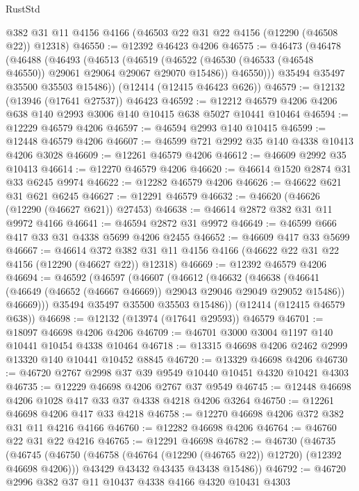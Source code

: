 \begin{lexlean}{RustStd}
\begin{coremodule}
{\begin{coremodule}
{{{{{{{{{{{{{{{{{{{{{{{{{{{{{{{{{{{{{{{{{{{{{{{{{{    @382
    @31
    @11
    @4156
    @4166
    (@46503 @22 @31 @22 @4156 (@12290 (@46508 @22)) @12318)
@46550 := @12392 @46423 @4206
@46575 := @46473
    (@46478
      (@46488
        (@46493
          (@46513
            (@46519
              (@46522 (@46530 (@46533 (@46548 @46550)) @29061 @29064 @29067 @29070 @15486))
              @46550)))
        @35494
        @35497
        @35500
        @35503
        @15486))
    (@12414 (@12415 @46423 @626))
@46579 := @12132 (@13946 (@17641 @27537)) @46423
@46592 := @12212 @46579 @4206 @4206 @638 @140 @2993 @3006 @140 @10415 @638 @5027 @10441 @10464
@46594 := @12229 @46579 @4206
@46597 := @46594 @2993 @140 @10415
@46599 := @12448 @46579 @4206
@46607 := @46599 @721 @2992 @35 @140 @4338 @10413 @4206 @3028
@46609 := @12261 @46579 @4206
@46612 := @46609 @2992 @35 @10413
@46614 := @12270 @46579 @4206
@46620 := @46614 @1520 @2874 @31 @33 @6245 @9974
@46622 := @12282 @46579 @4206
@46626 := @46622 @621 @31 @621 @6245
@46627 := @12291 @46579
@46632 := @46620 (@46626 (@12290 (@46627 @621)) @27453)
@46638 := @46614 @2872 @382 @31 @11 @9972 @4166
@46641 := @46594 @2872 @31 @9972
@46649 := @46599 @666 @417 @33 @31 @4338 @5699 @4206 @2455
@46652 := @46609 @417 @33 @5699
@46667 := @46614
    @372
    @382
    @31
    @11
    @4156
    @4166
    (@46622 @22 @31 @22 @4156 (@12290 (@46627 @22)) @12318)
@46669 := @12392 @46579 @4206
@46694 := @46592
    (@46597
      (@46607
        (@46612
          (@46632
            (@46638
              (@46641 (@46649 (@46652 (@46667 @46669)) @29043 @29046 @29049 @29052 @15486))
              @46669)))
        @35494
        @35497
        @35500
        @35503
        @15486))
    (@12414 (@12415 @46579 @638))
@46698 := @12132 (@13974 (@17641 @29593)) @46579
@46701 := @18097 @46698 @4206 @4206
@46709 := @46701 @3000 @3004 @1197 @140 @10441 @10454 @4338 @10464
@46718 := @13315 @46698 @4206 @2462 @2999 @13320 @140 @10441 @10452 @8845
@46720 := @13329 @46698 @4206
@46730 := @46720 @2767 @2998 @37 @39 @9549 @10440 @10451 @4320 @10421 @4303
@46735 := @12229 @46698 @4206 @2767 @37 @9549
@46745 := @12448 @46698 @4206 @1028 @417 @33 @37 @4338 @4218 @4206 @3264
@46750 := @12261 @46698 @4206 @417 @33 @4218
@46758 := @12270 @46698 @4206 @372 @382 @31 @11 @4216 @4166
@46760 := @12282 @46698 @4206
@46764 := @46760 @22 @31 @22 @4216
@46765 := @12291 @46698
@46782 := @46730
    (@46735
      (@46745
        (@46750 (@46758 (@46764 (@12290 (@46765 @22)) @12720) (@12392 @46698 @4206)))
        @43429
        @43432
        @43435
        @43438
        @15486))
@46792 := @46720 @2996 @382 @37 @11 @10437 @4338 @4166 @4320 @10431 @4303
}}}}}}}}}}}}}}}}}}}}}}}}}}}}}}}}}}}}}}}}}}}}}}}}}}
\end{coremodule}}
\end{coremodule}
\end{lexlean}

